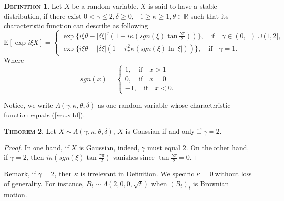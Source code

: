 \documentclass[a4paper, twoside, 11pt]{article}
\theoremstyle{definition}
\newtheorem{definition}{\scshape Definition}[section]
\newtheorem{theorem}[definition]{\scshape Theorem}
\begin{document}
\begin{definition}
  Let $X$ be a random variable. $X$ is said to have a stable distribution, if there exist $0 < \gamma \le 2, \delta \ge 0, -1 \ge \kappa \ge 1, \theta \in \mathbb{R}$ such that its characteristic function can describe as following
  \begin{equation}
	\mathrm{E} [\exp i\xi X] =  \begin{cases} \exp\{i \xi \theta - |\delta\xi|^\gamma(1-i\kappa(sgn(\xi)\tan \frac{\gamma\pi}{2}))\},\hspace{1em}  \text{if}\hspace{1em} \gamma \in (0, 1) \cup (1, 2], \\
	    \exp\{i \xi \theta - |\delta\xi|(1+i\frac{2}{\pi}\kappa(sgn(\xi)\ln |\xi|))\},\hspace{1em} \text{if}\hspace{1em} \gamma = 1.
	  \end{cases}
	\label{sec:stbl}
  \end{equation}
 Where
$$
 sgn(x) = \begin{cases} 1,\hspace{1em} \text{if}\hspace{1em} x > 1\\
   0,\hspace{1em} \text{if}\hspace{1em} x = 0 \\
   -1,\hspace{1em}\text{if}\hspace{1em} x < 0.
 \end{cases}
  $$
\end{definition}

Notice, we write $\Lambda(\gamma, \kappa, \theta, \delta)$ as one random variable whose characteristic function equals (\ref{sec:stbl}).

\begin{theorem}
  Let $X \sim \Lambda(\gamma, \kappa, \theta, \delta)$, $X$ is Gaussian if and only if $\gamma = 2$.
\end{theorem}
\begin{proof}
  In one hand, if $X$ is Gaussian, indeed, $\gamma$ must equal $2$. On the other hand, if $\gamma = 2$, then $i\kappa(sgn(\xi)\tan \frac{\gamma\pi}{2})$ vanishes since $\tan \frac{\gamma\pi}{2} = 0$.
\end{proof}
Remark, if $\gamma=2$, then $\kappa$ is irrelevant in Definition. We specific $\kappa = 0$ without loss of generality. For instance, $B_t \sim \Lambda(2, 0, 0, \sqrt{t})$ when $(B_t)_t$ is Brownian motion.
\end{document}
